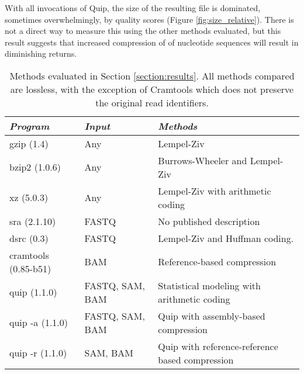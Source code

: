 \documentclass[twocolumn]{article}
\begin{document}
With all invocations of Quip, the size of the resulting file is dominated,
sometimes overwhelmingly, by quality scores (Figure \ref{fig:size_relative}).
There is not a direct way to measure this using the other methods evaluated,
but this result suggests that increased compression of of nucleotide sequences
will result in diminishing returns.



\begin{table*}
\begin{center}
\begin{tabular}{lll}
\textit{Program}     & \textit{Input} & \textit{Methods} \\ \hline
gzip (1.4)           & Any &
Lempel-Ziv \\

bzip2 (1.0.6)        & Any &
Burrows-Wheeler and Lempel-Ziv \\

xz  (5.0.3)          & Any & 
Lempel-Ziv with arithmetic coding \\

sra (2.1.10)         & FASTQ &
No published description \\

dsrc (0.3)           & FASTQ &
Lempel-Ziv and Huffman coding. \\

cramtools (0.85-b51) & BAM &
Reference-based compression \\

quip (1.1.0)         & FASTQ, SAM, BAM &
Statistical modeling with arithmetic coding \\

quip -a (1.1.0)      & FASTQ, SAM, BAM &
Quip with assembly-based compression \\

quip -r (1.1.0) & SAM, BAM &
Quip with reference-reference based compression \\
\end{tabular}
\caption{Methods evaluated in Section \ref{section:results}.
All methods compared are lossless, with the exception of Cramtools which
does not preserve the original read identifiers.}
\end{center}
\label{tab:methods}
\end{table*}
\end{document}
